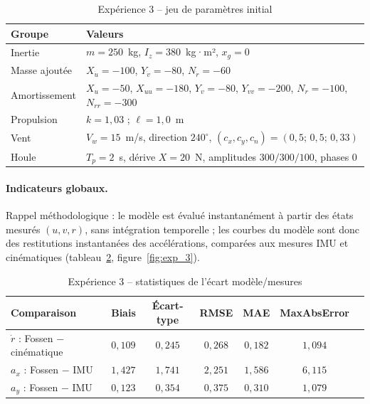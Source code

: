 \documentclass{rapportEILCO}
\begin{document}
	\begin{table}[H]
		\centering
		\caption{Expérience 3 -- jeu de paramètres initial}
		\label{tab:params_exp_3}
		\begin{tabular}{ll}
			\toprule
			\textbf{Groupe} & \textbf{Valeurs} \\
			\midrule
			Inertie & $m = 250$~kg, $I_z = 380$~kg·m², $x_g = 0$ \\
			Masse ajoutée & $X_{\dot u} = -100$, $Y_{\dot v} = -80$, $N_{\dot r} = -60$ \\
			Amortissement & $X_u = -50$, $X_{uu} = -180$, $Y_v = -80$, $Y_{vv} = -200$,
			$N_r = -100$, $N_{rr} = -300$ \\
			Propulsion & $k = 1,03$ ; $\ell = 1,0$~m \\
			Vent & $V_w = 15$~m/s, direction $240^\circ$, $(c_x, c_y, c_n) = (0,5;\,0,5;\,0,33)$ \\
			Houle & $T_p = 2$~s, dérive $X = 20$~N, amplitudes $300/300/100$, phases $0$\footnotemark \\
			\bottomrule
		\end{tabular}
	\end{table}
	
	\paragraph{Indicateurs globaux.}
		Rappel méthodologique : le modèle est évalué instantanément à partir des états mesurés
	$(u, v, r)$, sans intégration temporelle ; les courbes du modèle sont donc des restitutions
	instantanées des accélérations, comparées aux mesures IMU et cinématiques (tableau~\ref{tab:stats_exp_3}, figure~\ref{fig:exp_3}).
	
	\begin{table}[H]
		\centering
		\caption{Expérience 3 -- statistiques de l'écart modèle/mesures}
		\label{tab:stats_exp_3}
		\begin{tabular}{lcccccc}
			\toprule
			\textbf{Comparaison} & \textbf{Biais} & \textbf{Écart-type} & \textbf{RMSE}
			& \textbf{MAE} & \textbf{MaxAbsError} \\
			
			\midrule
			
			$\dot r$ : Fossen $-$ cinématique
			& $0,109$ & $0,245$ & $0,268$ & $0,182$
			& $1,094$ \\
			
			$a_x$ : Fossen $-$ IMU
			& $1,427$ & $1,741$ & $2,251$ & $1,586$
			& $6,115$  \\
			
			$a_y$ : Fossen $-$ IMU
			& $0,123$ & $0,354$ & $0,375$ & $0,310$
			& $1,079$  \\
			
			\bottomrule
		\end{tabular}
	\end{table}
	
\end{document}
